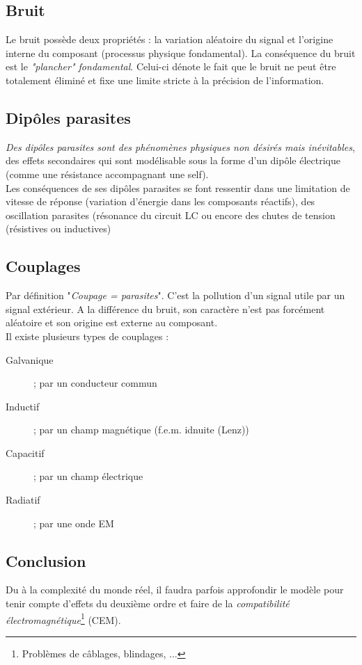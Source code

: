 \documentclass	[11pt, a4paper, openany]{book}
\begin{document}
\subsection{Bruit}
Le bruit possède deux propriétés : la variation aléatoire du signal et l'origine interne du composant (processus physique fondamental). La conséquence du bruit est le \textit{"plancher" fondamental}. Celui-ci dénote le fait que le bruit ne peut être totalement éliminé et fixe une limite stricte à la précision de l'information.

\subsection{Dipôles parasites}
\textit{Des dipôles parasites sont des phénomènes physiques non désirés mais inévitables}, des effets secondaires qui sont modélisable sous la forme d'un dipôle électrique (comme une résistance accompagnant une self).\\
Les conséquences de ses dipôles parasites se font ressentir dans une limitation de vitesse de réponse (variation d'énergie dans les composants réactifs), des oscillation parasites (résonance du circuit LC ou encore des chutes de tension (résistives ou inductives)


\subsection{Couplages}
Par définition "\textit{Coupage = parasites}". C'est la pollution d'un signal utile par un signal extérieur. A la différence du bruit, son caractère n'est pas forcément aléatoire et son origine est externe au composant.\\
Il existe plusieurs types de couplages :
\begin{description}
\item[Galvanique]; par un conducteur commun
\item[Inductif]; par un champ magnétique (f.e.m. idnuite (Lenz))
\item[Capacitif]; par un champ électrique
\item[Radiatif]; par une onde EM
\end{description}


\subsection{Conclusion}
Du à la complexité du monde réel, il faudra parfois approfondir le modèle pour tenir compte d'effets du deuxième ordre et faire de la \textit{compatibilité électromagnétique}\footnote{Problèmes de câblages, blindages, ...} (CEM).
\end{document}
